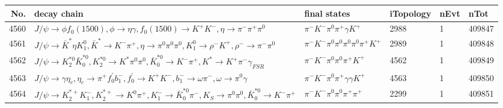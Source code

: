 \begin{table}[htbp] 
\begin{center}
\begin{small}
\begin{tabular}{rlllll}\hline\hline
 No. & decay chain & final states &  iTopology & nEvt & nTot \\\hline
4560&$J/\psi       \rightarrow \phi           f_{0}(1500)    , \phi            \rightarrow \eta          \gamma       , f_{0}(1500)     \rightarrow K^{+}          K^{-}          , \eta           \rightarrow \pi^{-}        \pi^{+}        \pi^{0}        $&$\pi^{-}        K^{-}          \pi^{0}        \pi^{+}        \gamma       K^{+}          $& 2988&    1&409847\\
4561&$J/\psi       \rightarrow \bar{K}^{*}   \eta          K_1^{0}        , \bar{K}^{*}    \rightarrow K^{-}          \pi^{+}        , \eta           \rightarrow \pi^{0}        \pi^{0}        \pi^{0}        , K_1^{0}         \rightarrow \rho^{-}      K^{+}          , \rho^{-}       \rightarrow \pi^{-}        \pi^{0}        $&$\pi^{-}        K^{-}          \pi^{0}        \pi^{0}        \pi^{0}        \pi^{0}        \pi^{+}        K^{+}          $& 2989&    1&409848\\
4562&$J/\psi       \rightarrow K_2^{*0}       \bar{K}_0^{*0}, K_2^{*0}        \rightarrow K^{*}          \pi^{0}        \pi^{0}        , \bar{K}_0^{*0} \rightarrow K^{-}          \pi^{+}        , K^{*}           \rightarrow K^{+}          \pi^{-}        \gamma_{FSR} $&$\pi^{-}        K^{-}          \pi^{0}        \pi^{0}        \pi^{+}        K^{+}          $& 4562&    1&409849\\
4563&$J/\psi       \rightarrow \gamma       \eta_{c}    , \eta_{c}     \rightarrow \pi^{+}        f^{'}_{0}     b_{1}^{-}      , f^{'}_{0}      \rightarrow K^{+}          K^{-}          , b_{1}^{-}       \rightarrow \omega         \pi^{-}        , \omega          \rightarrow \pi^{0}        \gamma       $&$\pi^{-}        K^{-}          \pi^{0}        \pi^{+}        \gamma       \gamma       K^{+}          $& 4563&    1&409850\\
4564&$J/\psi       \rightarrow K_2^{*+}       K_{1}^{-}      , K_2^{*+}        \rightarrow K^{0}          \pi^{+}        , K_{1}^{-}       \rightarrow \bar{K}_0^{*0}\pi^{-}        , K_{S}           \rightarrow \pi^{0}        \pi^{0}        , \bar{K}_0^{*0} \rightarrow K^{-}          \pi^{+}        $&$\pi^{-}        K^{-}          \pi^{0}        \pi^{0}        \pi^{+}        \pi^{+}        $& 2299&    1&409851\\

\end{tabular}
\end{small}
\end{center}
\end{table}
